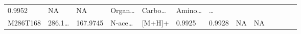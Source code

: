 \documentclass[
]{article}
\begin{document}
\begin{longtable}[]{@{}lllllllllllll@{}}
\begin{minipage}[t]{0.07\columnwidth}
0.9952\strut
\end{minipage} & \begin{minipage}[t]{0.05\columnwidth}\raggedright
NA\strut
\end{minipage} & \begin{minipage}[t]{0.04\columnwidth}\raggedright
NA\strut
\end{minipage} & \begin{minipage}[t]{0.05\columnwidth}\raggedright
Organ\ldots{}\strut
\end{minipage} & \begin{minipage}[t]{0.05\columnwidth}\raggedright
Carbo\ldots{}\strut
\end{minipage} & \begin{minipage}[t]{0.05\columnwidth}\raggedright
Amino\ldots{}\strut
\end{minipage} & \begin{minipage}[t]{0.02\columnwidth}\raggedright
\ldots{}\strut
\end{minipage}\tabularnewline
\begin{minipage}[t]{0.05\columnwidth}\raggedright
M286T168\strut
\end{minipage} & \begin{minipage}[t]{0.05\columnwidth}\raggedright
286.1\ldots{}\strut
\end{minipage} & \begin{minipage}[t]{0.05\columnwidth}\raggedright
167.9745\strut
\end{minipage} & \begin{minipage}[t]{0.05\columnwidth}\raggedright
N-ace\ldots{}\strut
\end{minipage} & \begin{minipage}[t]{0.05\columnwidth}\raggedright
{[}M+H{]}+\strut
\end{minipage} & \begin{minipage}[t]{0.07\columnwidth}\raggedright
0.9925\strut
\end{minipage} & \begin{minipage}[t]{0.07\columnwidth}\raggedright
0.9928\strut
\end{minipage} & \begin{minipage}[t]{0.05\columnwidth}\raggedright
NA\strut
\end{minipage} & \begin{minipage}[t]{0.04\columnwidth}\raggedright
NA\strut
\end{minipage} & \begin{minipage}[t]{0.05\columnwidth}\raggedright

\end{minipage}
\end{longtable}
\end{document}
